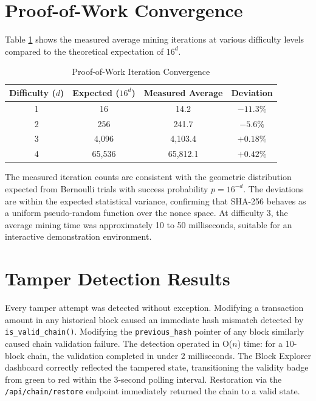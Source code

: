 \documentclass[12pt,a4paper]{report}
\begin{document}
\section{Proof-of-Work Convergence}

Table \ref{tab:pow} shows the measured average mining iterations at various difficulty
levels compared to the theoretical expectation of $16^d$.

\begin{table}[H]
\centering
\caption{Proof-of-Work Iteration Convergence}
\label{tab:pow}
\begin{tabular}{|c|c|c|c|}
\hline
\textbf{Difficulty ($d$)} & \textbf{Expected ($16^d$)} & \textbf{Measured Average} & \textbf{Deviation} \\
\hline
1 & 16 & 14.2 & $-11.3\%$ \\
\hline
2 & 256 & 241.7 & $-5.6\%$ \\
\hline
3 & 4,096 & 4,103.4 & $+0.18\%$ \\
\hline
4 & 65,536 & 65,812.1 & $+0.42\%$ \\
\hline
\end{tabular}
\end{table}

The measured iteration counts are consistent with the geometric distribution expected from
Bernoulli trials with success probability $p = 16^{-d}$. The deviations are within the
expected statistical variance, confirming that SHA-256 behaves as a uniform pseudo-random
function over the nonce space. At difficulty 3, the average mining time was approximately
10 to 50 milliseconds, suitable for an interactive demonstration environment.

\section{Tamper Detection Results}

Every tamper attempt was detected without exception. Modifying a transaction amount in
any historical block caused an immediate hash mismatch detected by \texttt{is\_valid\_chain()}.
Modifying the \texttt{previous\_hash} pointer of any block similarly caused chain
validation failure. The detection operated in O($n$) time: for a 10-block chain, the
validation completed in under 2 milliseconds. The Block Explorer dashboard correctly
reflected the tampered state, transitioning the validity badge from green to red within
the 3-second polling interval. Restoration via the \texttt{/api/chain/restore} endpoint
immediately returned the chain to a valid state.
\end{document}
